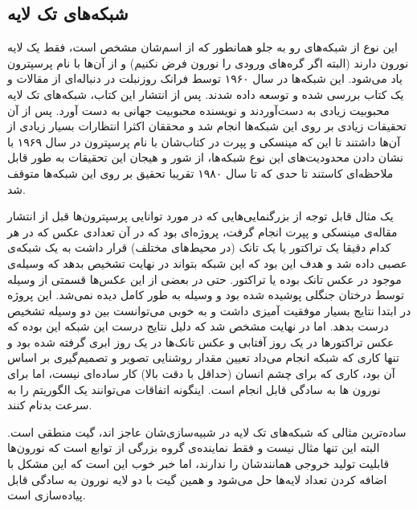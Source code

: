 \documentclass[11pt,a4paper,twocolumn]{article}
\begin{document}
\subsection{شبکه‌های تک لایه}
این نوع از شبکه‌های رو به جلو همانطور که از اسم‌شان مشخص است، فقط یک لایه نورون دارند (البته اگر گره‌های ورودی را نورون فرض نکنیم) و از آن‌ها با نام 
پرسپترون
یاد می‌شود. این شبکه‌ها در سال ۱۹۶۰ توسط
فرانک روزنبلت
در دنباله‌ای از مقالات و یک 
کتاب
بررسی شده و توسعه داده‌ شدند. پس از انتشار این کتاب، شبکه‌های تک لایه محبوبیت زیادی به دست‌آوردند و نویسنده محبوبیت جهانی به دست آورد. پس از آن تحقیقات زیادی بر روی این شبکه‌ها انجام شد و محققان اکثرا انتظارات بسیار زیادی از آن‌ها داشتند تا این که مینسکی
و پپرت
در کتاب‌شان با نام پرسپترون
در سال ۱۹۶۹ با نشان دادن محدودیت‌های این نوع شبکه‌ها، از شور و هیجان این تحقیقات به طور قابل ملاحظه‌ای کاستند تا حدی که تا سال ۱۹۸۰ تقریبا تحقیق بر روی این شبکه‌ها متوقف شد.\cite{wiki-frank}

یک مثال قابل توجه از بزرگنمایی‌هایی که در مورد توانایی پرسپترون‌ها قبل از انتشار مقاله‌ی مینسکی و پپرت انجام گرفت، پروژه‌ای بود که در آن تعدادی عکس که در هر کدام دقیقا یک تراکتور یا یک تانک (در محیط‌های مختلف) قرار داشت به یک شبکه‌ی عصبی داده شد و هدف این بود که این شبکه بتواند در نهایت تشخیص بدهد که وسیله‌ی موجود در عکس تانک بوده یا تراکتور. حتی در بعضی از این عکس‌ها قسمتی از وسیله توسط درختان جنگلی پوشیده شده بود و وسیله به طور کامل دیده نمی‌شد. این پروژه در ابتدا نتایج بسیار موفقیت آمیزی داشت و به خوبی می‌توانست بین دو وسیله تشخیص درست بدهد. اما در نهایت مشخص شد که دلیل نتایج درست این شبکه این بوده که عکس تراکتورها در یک روز آفتابی و عکس تانک‌ها در یک روز ابری گرفته شده بود و تنها کاری که شبکه انجام می‌داد تعیین مقدار روشنایی تصویر و تصمیم‌گیری بر اساس آن بود، کاری که برای چشم انسان (حداقل با دقت بالا) کار ساده‌ای نیست، اما برای نورون ها به سادگی قابل انجام است. اینگونه اتفاقات می‌توانند یک الگوریتم را به سرعت بدنام کنند.	\cite{ml-hinton}

ساده‌ترین مثالی که شبکه‌های تک لایه در شبیه‌سازی‌شان عاجز اند، گیت منطقی 
 است. البته این تنها مثال نیست و فقط نماینده‌ی گروه بزرگی از توابع است که نورون‌ها قابلیت تولید خروجی همانند‌شان را ندارند، اما خبر خوب این است که این مشکل با اضافه کردن تعداد لایه‌ها حل می‌شود و همین گیت 
 با دو لایه نورون به سادگی قابل پیاده‌سازی است.
 
\end{document}
